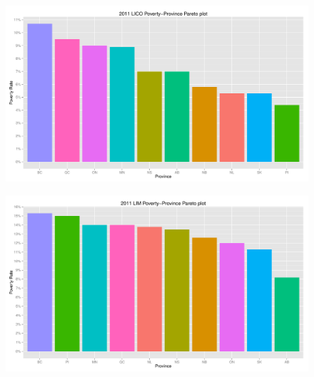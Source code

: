 \documentclass{article}\usepackage[]{graphicx}\usepackage[]{color}
\makeatletter
\def\maxwidth{ %
  \ifdim\Gin@nat@width>\linewidth
    \linewidth
  \else
    \Gin@nat@width
  \fi
}
\newenvironment{knitrout}{}{} %
\makeatother
\begin{document}
\begin{figure}[ht]
\begin{center}
\begin{knitrout}
\color{fgcolor}
\includegraphics[width=\maxwidth]{figure/unnamed-chunk-24} 

\end{knitrout}

\end{center}
\end{figure}
\begin{figure}[ht]
\begin{center}
\begin{knitrout}
\color{fgcolor}
\includegraphics[width=\maxwidth]{figure/unnamed-chunk-25} 

\end{knitrout}

\end{center}
\end{figure}
\end{document}
